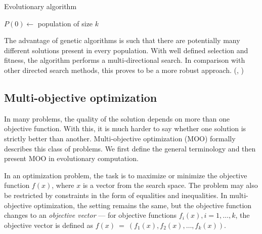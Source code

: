 \begin{algorithm}
\DontPrintSemicolon 
\caption{Evolutionary algorithm\label{alg:EA}}
  \SetNoFillComment
  \;
  $P(0) \longleftarrow$ population of size $k$

  \;
\end{algorithm}

The advantage of genetic algorithms is such that there are potentially 
many different solutions present in every population. With well defined 
selection and fitness, the algorithm performs a multi-directional search. 
In comparison with other directed search methods, this proves to be a more 
robust approach. (\cite{Michalewicz:1996:GAD:229930}, 
\cite{Mitchell:1997:ML:541177}) %

\subsection{Multi-objective optimization} \label{moo}
In many problems, the quality of the solution depends on more than one
objective function. With this, it is much harder to say whether one solution
is strictly better than another. Multi-objective optimization (MOO) formally
describes this class of problems. We first define the general terminology
and then present MOO in evolutionary computation.

In an optimization problem, the task is to maximize or minimize the objective
function $f(x)$, where $x$ is a vector from the search space. The problem may
also be restricted by constraints in the form of equalities and inequalities.
In multi-objective optimization, the setting remains the same, but the
objective function changes to an \emph{objective vector} ---
for objective functions $f_i(x), i = 1,\ldots,k$, the objective vector is 
defined as $f(x)~=~(f_1(x), f_2(x), \ldots, f_k(x))$.

